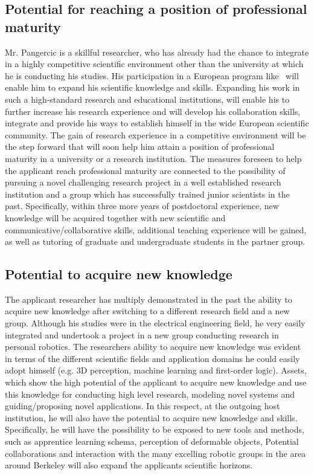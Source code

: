 \subsection{Potential for reaching a position of professional maturity}
Mr. Pangercic is a skillful researcher, who has already had the chance to integrate in a highly 
competitive scientific environment other than the university at which he is conducting his
studies.  His participation in a European program like \ksem\ will enable him to expand 
his scientific knowledge and skills. Expanding his work in such a high-standard research 
and educational institutions, will enable his to further increase his 
research experience and will develop his collaboration skills, integrate and  provide his 
ways to establish himself in the wide European scientific community. The gain of research 
experience in a competitive environment will be the step forward that will soon help him
attain a position of professional maturity in a university or a research institution. The 
measures foreseen to help the applicant reach professional maturity are connected to the 
possibility of pursuing a novel challenging research project in a well established research 
institution and a group which has successfully trained junior scientists in the past. 
Specifically, within three more years of postdoctoral experience, new knowledge will be 
acquired together with new scientific and communicative/collaborative skills, additional 
teaching experience will be gained, as well as tutoring of graduate and undergraduate 
students in the partner group.
\subsection{Potential to acquire new knowledge}
The applicant researcher has multiply demonstrated in the past the ability to acquire new 
knowledge after switching to a different research field and a new group. Although his
studies were in the electrical engineering field, he very 
easily integrated and undertook a project in a new group conducting  research in personal
robotics. The researchers ability to acquire new knowledge was evident in terms of 
the different scientific fields and application domains he could easily adopt himself (e.g. 3D perception, machine
learning and first-order logic). Assets, which show the high potential of the applicant to acquire new 
knowledge and use this knowledge for conducting high level research, modeling novel 
systems and guiding/proposing novel applications. In this respect, at the 
outgoing host institution, he will also have the potential to acquire new knowledge and skills. 
Specifically, he will have the possibility to be exposed to new tools and methods, such as 
apprentice learning schema, perception of deformable objects, 
Potential collaborations and interaction with the many excelling 
robotic groups in the area around Berkeley will also 
expand the applicants scientific horizons. 

\newpage
